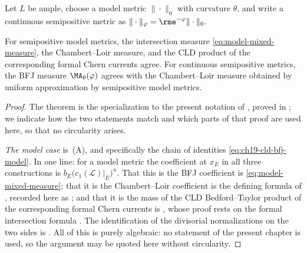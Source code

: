 Let \(L\) be ample, choose a model metric \(\|\cdot\|_0\) with curvature
\(\theta\), and write a continuous semipositive metric as
\(\|\cdot\|_\varphi=\rme^{-\varphi}\|\cdot\|_0\).

\begin{theorem}\label{thm:bfj-cld-ma-common-locus}
For semipositive model metrics, the intersection measure
\eqref{eq:model-mixed-measure}, the Chambert--Loir measure, and the CLD
product of the corresponding formal Chern currents agree. For continuous
semipositive metrics, the BFJ measure \(\MA_\theta(\varphi)\) agrees with the
Chambert--Loir measure obtained by uniform approximation by semipositive
model metrics.
\end{theorem}

\begin{proof}
The theorem is the specialization to the present notation of
, proved in ; we
indicate how the two statements match and which parts of that proof are used
here, so that no circularity arises.

\emph{The model case} is
\,(A), and specifically the chain of
identities \eqref{eq:ch19-cld-bfj-model}.  In one line: for a model metric
the coefficient at \(x_E\) in all three constructions is
\(b_E\bigl(c_1(\mathcal L)|_E\bigr)^n\).  That this is the BFJ coefficient is
\eqref{eq:model-mixed-measure}; that it is the Chambert--Loir coefficient is
the defining formula of \cite{CL06}, recorded here as
; and that it is the mass of the CLD
Bedford--Taylor product of the corresponding formal Chern currents is
, whose proof rests on the formal intersection
formula \cite[Theorem~18.5.5 and Proposition~18.5.8]{CLD25}.  The
identification of the divisorial normalizations on the two sides is
.  All of this is purely algebraic: no
statement of the present chapter is used, so the argument may be quoted here
without circularity.


\end{proof}
